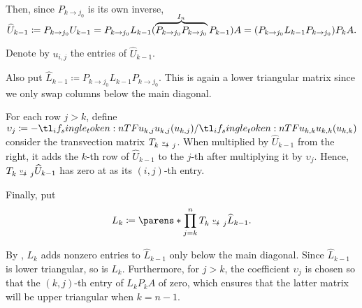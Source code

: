 \begin{algorithm}
\begin{thmenum}
    Then, since \( P_{k \to j_0} \) is its own inverse,
    \begin{equation*}
      \widehat{U}_{k-1} \coloneqq P_{k \to j_0} U_{k-1} = P_{k \to j_0} L_{k-1} (\smash{ \overbrace{P_{k \to j_0} P_{k \to j_0}}^{I_n} P_{k-1}) A = (P_{k \to j_0} L_{k-1} P_{k \to j_0}) } P_k A.
    \end{equation*}

    Denote by \( u_{i,j} \) the entries of \( \widehat{U}_{k-1} \).

    Also put \( \widehat{L}_{k-1} \coloneqq P_{k \to j_0} L_{k-1} P_{k \to j_0} \). This is again a lower triangular matrix since we only swap columns below the main diagonal.

    For each row \( j > k \), define \( \upsilon_j \coloneqq - \ifrac {u_{k,j}} {u_{k,k}} \) consider the transvection matrix \( T_{k \reloset {\upsilon_j} \to j} \). When multiplied by \( \widehat{U}_{k-1} \) from the right, it adds the \( k \)-th row of \( \widehat{U}_{k-1} \) to the \( j \)-th after multiplying it by \( \upsilon_j \). Hence, \( T_{k \reloset {\upsilon_j} \to j} \widehat{U}_{k-1} \) has zero at as its \( (i, j) \)-th entry.

    Finally, put
    \begin{equation*}
      L_k \coloneqq \parens*{ \prod_{j=k}^n T_{k \reloset {\upsilon_j} \to j} } \widehat{L}_{k-1}.
    \end{equation*}

    By , \( L_k \) adds nonzero entries to \( \widehat{L}_{k-1} \) only below the main diagonal. Since \( \widehat{L}_{k-1} \) is lower triangular, so is \( L_k \). Furthermore, for \( j > k \), the coefficient \( \upsilon_j \) is chosen so that the \( (k, j) \)-th entry of \( L_k P_k A \) of zero, which ensures that the latter matrix will be upper triangular when \( k = n - 1 \).
  \end{thmenum}
\end{algorithm}

